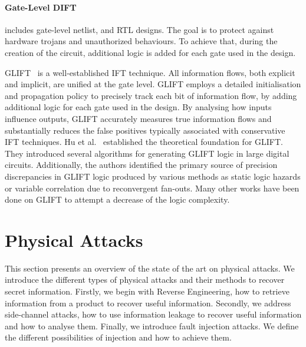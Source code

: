 \paragraph{Gate-Level DIFT} includes gate-level netlist, and RTL designs. The goal is to protect against hardware trojans and unauthorized behaviours. To achieve that, during the creation of the circuit, additional logic is added for each gate used in the design.

GLIFT~\cite{TWMMCS-09-asplos} is a well-established IFT technique. All information flows, both explicit and implicit, are unified at the gate level. GLIFT employs a detailed initialisation and propagation policy to precisely track each bit of information flow, by adding additional logic for each gate used in the design. By analysing how inputs influence outputs, GLIFT accurately measures true information flows and substantially reduces the false positives typically associated with conservative IFT techniques.
Hu et al.~\cite{HOITSMK-11-tcad} established the theoretical foundation for GLIFT. They introduced several algorithms for generating GLIFT logic in large digital circuits. Additionally, the authors identified the primary source of precision discrepancies in GLIFT logic produced by various methods as static logic hazards or variable correlation due to reconvergent fan-outs. Many other works have been done on GLIFT to attempt a decrease of the logic complexity.

\section{Physical Attacks}
\label{section:physicalAttacks}

This section presents an overview of the state of the art on physical attacks. We introduce the different types of physical attacks and their methods to recover secret information. Firstly, we begin with Reverse Engineering, how to retrieve information from a product to recover useful information.
Secondly, we address side-channel attacks, how to use information leakage to recover useful information and how to analyse them.
Finally, we introduce fault injection attacks. We define the different possibilities of injection and how to achieve them.

